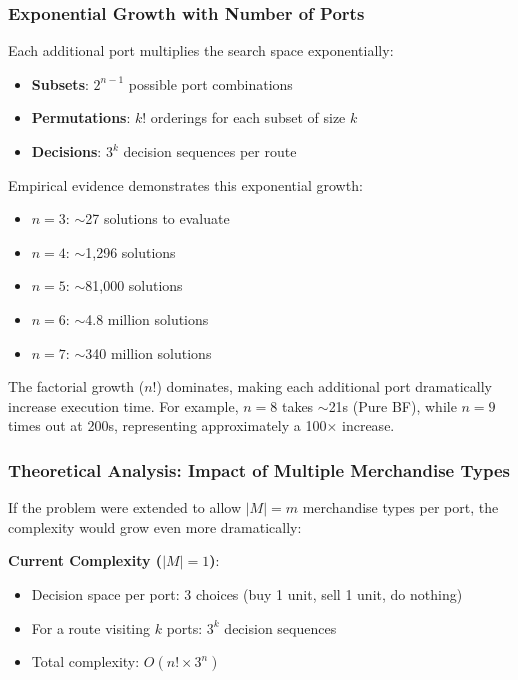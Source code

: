 \documentclass[12pt]{article}
\begin{document}
\subsubsection{Exponential Growth with Number of Ports}

Each additional port multiplies the search space exponentially:
\begin{itemize}
    \item \textbf{Subsets}: $2^{n-1}$ possible port combinations
    \item \textbf{Permutations}: $k!$ orderings for each subset of size $k$
    \item \textbf{Decisions}: $3^k$ decision sequences per route
\end{itemize}

Empirical evidence demonstrates this exponential growth:
\begin{itemize}
    \item $n=3$: $\sim$27 solutions to evaluate
    \item $n=4$: $\sim$1,296 solutions
    \item $n=5$: $\sim$81,000 solutions
    \item $n=6$: $\sim$4.8 million solutions
    \item $n=7$: $\sim$340 million solutions
\end{itemize}

The factorial growth ($n!$) dominates, making each additional port dramatically increase execution time. For example, $n=8$ takes $\sim$21s (Pure BF), while $n=9$ times out at 200s, representing approximately a 100$\times$ increase.

\subsubsection{Theoretical Analysis: Impact of Multiple Merchandise Types}

If the problem were extended to allow $|M| = m$ merchandise types per port, the complexity would grow even more dramatically:

\textbf{Current Complexity ($|M| = 1$)}:
\begin{itemize}
    \item Decision space per port: 3 choices (buy 1 unit, sell 1 unit, do nothing)
    \item For a route visiting $k$ ports: $3^k$ decision sequences
    \item Total complexity: $O(n! \times 3^n)$
\end{itemize}
\end{document}
